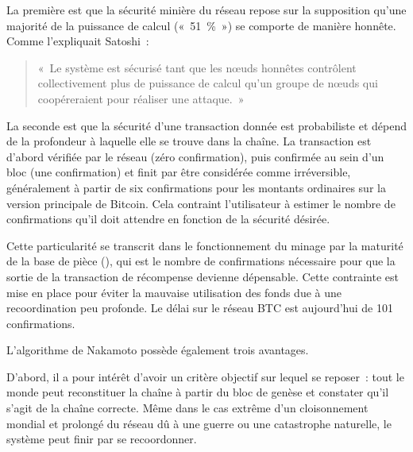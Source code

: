 La première est que la sécurité minière du réseau repose sur la supposition qu'une majorité de la puissance de calcul («~51~\%~») se comporte de manière honnête. Comme l'expliquait Satoshi~:

\begin{quote}
«~Le système est sécurisé tant que les nœuds honnêtes contrôlent collectivement plus de puissance de calcul qu'un groupe de nœuds qui coopéreraient pour réaliser une attaque.~»
\end{quote}

La seconde est que la sécurité d'une transaction donnée est probabiliste et dépend de la profondeur à laquelle elle se trouve dans la chaîne. La transaction est d'abord vérifiée par le réseau (zéro confirmation), puis confirmée au sein d'un bloc (une confirmation) et finit par être considérée comme irréversible, généralement à partir de six confirmations pour les montants ordinaires sur la version principale de Bitcoin. Cela contraint l'utilisateur à estimer le nombre de confirmations qu'il doit attendre en fonction de la sécurité désirée.

Cette particularité se transcrit dans le fonctionnement du minage par la maturité de la base de pièce (), qui est le nombre de confirmations nécessaire pour que la sortie de la transaction de récompense devienne dépensable. Cette contrainte est mise en place pour éviter la mauvaise utilisation des fonds due à une recoordination peu profonde. Le délai sur le réseau BTC est aujourd'hui de 101 confirmations.


L'algorithme de Nakamoto possède également trois avantages. 

D'abord, il a pour intérêt d'avoir un critère objectif sur lequel se reposer~: tout le monde peut reconstituer la chaîne à partir du bloc de genèse et constater qu'il s'agit de la chaîne correcte. Même dans le cas extrême d'un cloisonnement mondial et prolongé du réseau dû à une guerre ou une catastrophe naturelle, le système peut finir par se recoordonner.

